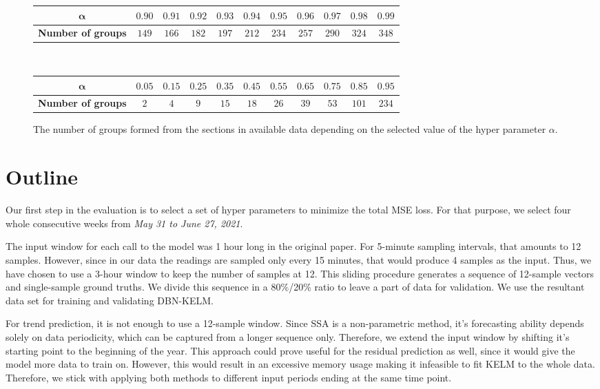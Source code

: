 \begin{figure}
\begin{minipage}{\textwidth}
\begin{tabular}{c|c|c|c|c|c|c|c|c|c|c}
			$\mathbf{\alpha}$ & $0.90$ & $0.91$ & $0.92$ & $0.93$ & $0.94$ &
			$0.95$ & $0.96$ & $0.97$ & $0.98$ & $0.99$ \\
			\hline
			\textbf{Number of groups} & $149$ & $166$ & $182$ & $197$ & $212$ &
			$234$ & $257$ & $290$ & $324$ & $348$
		\end{tabular}\\
		\begin{tabular}{c|c|c|c|c|c|c|c|c|c|c}
			$\mathbf{\alpha}$ & $0.05$ & $0.15$ & $0.25$ & $0.35$ & $0.45$ &
			$0.55$ & $0.65$ & $0.75$ & $0.85$ & $0.95$ \\
			\hline
			\textbf{Number of groups} & $2$ & $4$ & $9$ & $15$ & $18$ & $26$ &
			$39$ & $53$ & $101$ & $234$
		\end{tabular}
	\end{minipage}
	\caption{The number of groups formed from the sections in available data depending on the selected value of the hyper parameter $\alpha$.}
	\label{fig:alpha-groups}
\end{figure}


\section{Outline}

Our first step in the evaluation is to select a set of hyper parameters to
minimize the total MSE loss. For that purpose, we select four whole consecutive
weeks from \textit{May 31 to June 27, 2021}.

The input window for each call to the model was 1 hour long in the original
paper. For 5-minute sampling intervals, that amounts to 12 samples. However,
since in our data the readings are sampled only every 15 minutes, that would
produce 4 samples as the input. Thus, we have chosen to use a 3-hour window to
keep the number of samples at 12. This sliding procedure generates a sequence of
12-sample vectors and single-sample ground truths. We divide this sequence in a
80\%/20\% ratio to leave a part of data for validation. We use the resultant
data set for training and validating DBN-KELM.

For trend prediction, it is not enough to use a 12-sample window. Since SSA is a
non-parametric method, it's forecasting ability depends solely on data
periodicity, which can be captured from a longer sequence only. Therefore, we
extend the input window by shifting it's starting point to the beginning of the
year. This approach could prove useful for the residual prediction as well,
since it would give the model more data to train on. However, this would
result in an excessive memory usage making it infeasible to fit KELM to the
whole data. Therefore, we stick with applying both methods to different input
periods ending at the same time point.

